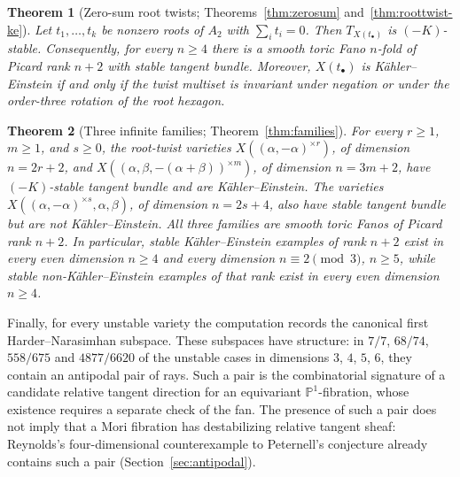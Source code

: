 \documentclass[11pt]{amsart}
\newtheorem{theorem}{Theorem}[section]
\theoremstyle{definition}
\theoremstyle{remark}
\newcommand{\PP}{\mathbb{P}}
\begin{document}
\begin{theorem}[Zero-sum root twists; Theorems~\ref{thm:zerosum}
and~\ref{thm:roottwist-ke}]
Let $t_1,\dots,t_k$ be nonzero roots of $A_2$ with
$\sum_i t_i=0$. Then $T_{X(t_\bullet)}$ is $(-K)$-stable. Consequently,
for every $n\ge4$ there is a smooth toric Fano $n$-fold of Picard rank
$n+2$ with stable tangent bundle. Moreover, $X(t_\bullet)$ is
K\"ahler--Einstein if and only if the twist multiset is invariant under
negation or under the order-three rotation of the root hexagon.
\end{theorem}

\begin{theorem}[Three infinite families; Theorem~\ref{thm:families}]
For every $r \ge 1$, $m \ge 1$, and $s \ge 0$, the root-twist varieties
$X((\alpha,-\alpha)^{\times r})$, of dimension $n = 2r + 2$, and
$X((\alpha,\beta,-(\alpha{+}\beta))^{\times m})$, of dimension
$n = 3m + 2$, have $(-K)$-stable tangent bundle and are
K\"ahler--Einstein. The varieties
$X((\alpha,-\alpha)^{\times s},\alpha,\beta)$, of dimension $n=2s+4$,
also have stable tangent bundle but are not K\"ahler--Einstein. All three
families are smooth toric Fanos of Picard rank $n+2$. In particular, stable
K\"ahler--Einstein examples of rank $n+2$ exist in every even dimension
$n\ge4$ and every dimension $n\equiv2\pmod3$, $n\ge5$, while stable
non-K\"ahler--Einstein examples of that rank exist in every even dimension
$n\ge4$.
\end{theorem}

Finally, for every unstable variety the computation records the canonical
first Harder--Narasimhan subspace. These subspaces have structure: in $7/7$,
$68/74$, $558/675$ and $4877/6620$ of the unstable cases in dimensions
$3$, $4$, $5$, $6$, they contain an antipodal pair of rays. Such a pair is
the combinatorial signature of a candidate relative tangent direction for an
equivariant $\PP^1$-fibration, whose existence requires a separate check
of the fan. The presence of such a pair does not imply that a Mori fibration
has destabilizing relative tangent sheaf: Reynolds's four-dimensional
counterexample to Peternell's conjecture \cite[Theorem~2.2.6]{Reynolds2023}
already contains such a pair (Section~\ref{sec:antipodal}).
\end{document}
